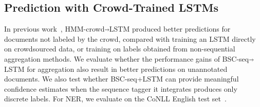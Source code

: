 
\subsection{Prediction with Crowd-Trained LSTMs}\label{sec:task2}


In previous work~\cite{nguyen2017aggregating}, HMM-crowd$\Arrow{.2cm}$LSTM
produced better predictions for documents not labeled by the crowd, compared with 
training an LSTM directly on crowdsourced data, or training
on labels obtained from non-sequential aggregation methods. 
We evaluate whether the performance gains of BSC-seq$\Arrow{.2cm}$LSTM for aggregation also result in better predictions 
on unannotated documents. 
We also test whether 
BSC-seq+LSTM can provide meaningful 
confidence estimates when the sequence tagger it integrates produces only discrete labels.
For NER, we evaluate on the CoNLL English test set~\cite{tjong2003introduction}.

